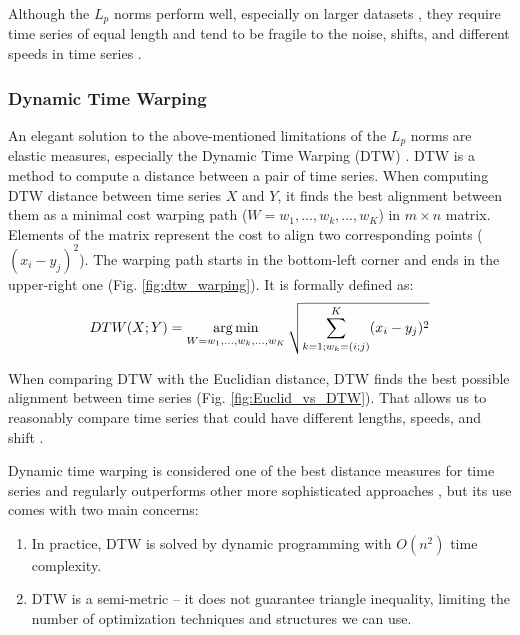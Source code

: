 Although the $L_p$ norms perform well, especially on larger datasets \cite{met:universal, met:comparison-new, met:met-comparison}, they require time series of equal length and tend to be fragile to the noise, shifts, and different speeds in time series \cite{met:classification}.

\subsubsection{Dynamic Time Warping}
An elegant solution to the above-mentioned limitations of the $L_p$ norms are elastic measures, especially the Dynamic Time Warping (DTW) \cite{met:dtw}. DTW is a method to compute a distance between a pair of time series. When computing DTW distance between time series $X$ and $Y$, it finds the best alignment between them as a minimal cost warping path ($W=w_1 ,...,w_k ,...,w_K$) in $m \times n$ matrix. Elements of the matrix represent the cost to align two corresponding points ($(x_i - y_j)^2$). The warping path starts in the bottom-left corner and ends in the upper-right one (Fig. \ref{fig:dtw_warping}). It is formally defined as:
\begin{equation}
    DTW(X; Y) = \operatorname*{arg\,min}_{W=w_1 ,...,w_k ,...,w_K} \sqrt{ \sum^{K}_{k=1; w_k=(i; j)} (x_i - y_j)^2}
\end{equation}

When comparing DTW with the Euclidian distance, DTW finds the best possible alignment between time series (Fig. \ref{fig:Euclid_vs_DTW}). That allows us to reasonably compare time series that could have different lengths, speeds, and shift \cite{met:dtw, met:dtw-window}.

Dynamic time warping is considered one of the best distance measures for time series and regularly outperforms other more sophisticated approaches \cite{met:universal, met:comparison-new, met:dtw-best-1, met:dtw-best-0}, but its use comes with two main concerns:
\begin{enumerate}
    \item In practice, DTW is solved by dynamic programming with $O(n^2)$ time complexity.
    \item DTW is a semi-metric -- it does not guarantee triangle inequality, limiting the number of optimization techniques and structures we can use.  
\end{enumerate}

